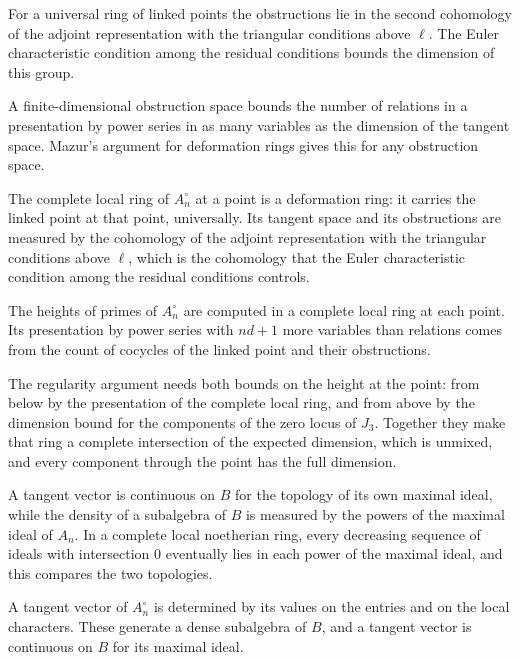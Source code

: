 For a universal ring of linked points the obstructions lie in the second cohomology of the adjoint representation with the triangular conditions above $\ell$. The Euler characteristic condition among the residual conditions bounds the dimension of this group.

A finite-dimensional obstruction space bounds the number of relations in a presentation by power series in as many variables as the dimension of the tangent space. Mazur's argument for deformation rings gives this for any obstruction space.

The complete local ring of $A_n^\circ$ at a point is a deformation ring: it carries the linked point at that point, universally. Its tangent space and its obstructions are measured by the cohomology of the adjoint representation with the triangular conditions above $\ell$, which is the cohomology that the Euler characteristic condition among the residual conditions controls.

The heights of primes of $A_n^\circ$ are computed in a complete local ring at each point. Its presentation by power series with $nd+1$ more variables than relations comes from the count of cocycles of the linked point and their obstructions.

The regularity argument needs both bounds on the height at the point: from below by the presentation of the complete local ring, and from above by the dimension bound for the components of the zero locus of $J_3$. Together they make that ring a complete intersection of the expected dimension, which is unmixed, and every component through the point has the full dimension.

A tangent vector is continuous on $B$ for the topology of its own maximal ideal, while the density of a subalgebra of $B$ is measured by the powers of the maximal ideal of $A_n$. In a complete local noetherian ring, every decreasing sequence of ideals with intersection $0$ eventually lies in each power of the maximal ideal, and this compares the two topologies.

A tangent vector of $A_n^\circ$ is determined by its values on the entries and on the local characters. These generate a dense subalgebra of $B$, and a tangent vector is continuous on $B$ for its maximal ideal.

